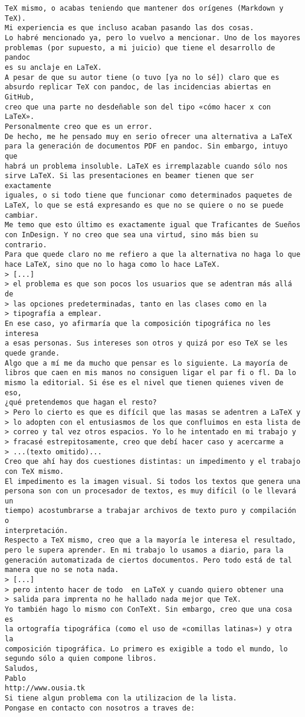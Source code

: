 \documentclass[a4paper,10pt]{article}
\begin{document}
\begin{lstlisting}
TeX mismo, o acabas teniendo que mantener dos orígenes (Markdown y TeX).
Mi experiencia es que incluso acaban pasando las dos cosas.
Lo habré mencionado ya, pero lo vuelvo a mencionar. Uno de los mayores
problemas (por supuesto, a mi juicio) que tiene el desarrollo de pandoc
es su anclaje en LaTeX.
A pesar de que su autor tiene (o tuvo [ya no lo sé]) claro que es
absurdo replicar TeX con pandoc, de las incidencias abiertas en GitHub,
creo que una parte no desdeñable son del tipo «cómo hacer x con LaTeX».
Personalmente creo que es un error.
De hecho, me he pensado muy en serio ofrecer una alternativa a LaTeX
para la generación de documentos PDF en pandoc. Sin embargo, intuyo que
habrá un problema insoluble. LaTeX es irremplazable cuando sólo nos
sirve LaTeX. Si las presentaciones en beamer tienen que ser exactamente
iguales, o si todo tiene que funcionar como determinados paquetes de
LaTeX, lo que se está expresando es que no se quiere o no se puede cambiar.
Me temo que esto último es exactamente igual que Traficantes de Sueños
con InDesign. Y no creo que sea una virtud, sino más bien su contrario.
Para que quede claro no me refiero a que la alternativa no haga lo que
hace LaTeX, sino que no lo haga como lo hace LaTeX.
> [...]
> el problema es que son pocos los usuarios que se adentran más allá de
> las opciones predeterminadas, tanto en las clases como en la
> tipografía a emplear.
En ese caso, yo afirmaría que la composición tipográfica no les interesa
a esas personas. Sus intereses son otros y quizá por eso TeX se les
quede grande.
Algo que a mí me da mucho que pensar es lo siguiente. La mayoría de
libros que caen en mis manos no consiguen ligar el par fi o fl. Da lo
mismo la editorial. Si ése es el nivel que tienen quienes viven de eso,
¿qué pretendemos que hagan el resto?
> Pero lo cierto es que es difícil que las masas se adentren a LaTeX y
> lo adopten con el entusiasmos de los que confluimos en esta lista de
> correo y tal vez otros espacios. Yo lo he intentado en mi trabajo y
> fracasé estrepitosamente, creo que debí hacer caso y acercarme a
> ...(texto omitido)...
Creo que ahí hay dos cuestiones distintas: un impedimento y el trabajo
con TeX mismo.
El impedimento es la imagen visual. Si todos los textos que genera una
persona son con un procesador de textos, es muy difícil (o le llevará un
tiempo) acostumbrarse a trabajar archivos de texto puro y compilación o
interpretación.
Respecto a TeX mismo, creo que a la mayoría le interesa el resultado,
pero le supera aprender. En mi trabajo lo usamos a diario, para la
generación automatizada de ciertos documentos. Pero todo está de tal
manera que no se nota nada.
> [...]
> pero intento hacer de todo  en LaTeX y cuando quiero obtener una
> salida para imprenta no he hallado nada mejor que TeX.
Yo también hago lo mismo con ConTeXt. Sin embargo, creo que una cosa es
la ortografía tipográfica (como el uso de «comillas latinas») y otra la
composición tipográfica. Lo primero es exigible a todo el mundo, lo
segundo sólo a quien compone libros.
Saludos,
Pablo
http://www.ousia.tk
Si tiene algun problema con la utilizacion de la lista.
Pongase en contacto con nosotros a traves de:


\end{lstlisting}
\end{document}
